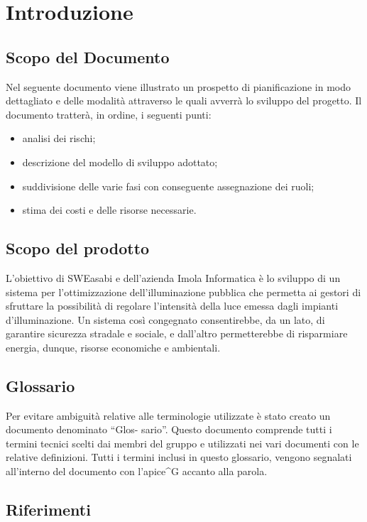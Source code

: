 \chapter{Introduzione}

\section{Scopo del Documento}
Nel seguente documento viene illustrato un prospetto di pianificazione in modo dettagliato e delle modalità attraverso le quali avverrà lo sviluppo del progetto. Il documento tratterà, in ordine, i seguenti punti:
\begin{itemize}
    \item analisi dei rischi;
    \item descrizione del modello di sviluppo adottato;
    \item suddivisione delle varie fasi con conseguente assegnazione dei ruoli;
    \item stima dei costi e delle risorse necessarie.
\end{itemize}

\section{Scopo del prodotto}
L'obiettivo di SWEasabi e dell'azienda Imola Informatica è lo sviluppo di un sistema per l'ottimizzazione dell'illuminazione pubblica che permetta ai gestori di sfruttare la possibilità di regolare l'intensità della luce emessa dagli impianti d'illuminazione. Un sistema così congegnato consentirebbe, da un lato, di garantire sicurezza stradale e sociale, e dall'altro permetterebbe di risparmiare energia, dunque, risorse economiche e ambientali.


\section{Glossario}
Per evitare ambiguità relative alle terminologie utilizzate è stato creato un documento denominato “Glos-
sario”. Questo documento comprende tutti i termini tecnici scelti dai membri del gruppo e utilizzati nei
vari documenti con le relative definizioni. Tutti i termini inclusi in questo glossario, vengono segnalati
all'interno del documento con l'apice^{G} accanto alla parola.

\section{Riferimenti}

